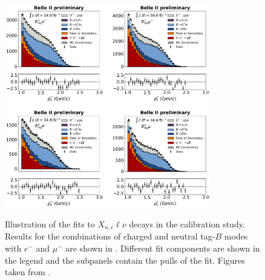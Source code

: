 \begin{figure}[htbp!]
{{            \includegraphics[width=0.8\textwidth]{figures/data_sim_corrections/tag_calibration.png}
        }
    }
    \caption{\label{fig:fei_calib} Illustration of the fits to \B\to$X_{u,c}\ell\nu$ decays in the \FEI calibration study.
    Results for the combinations of charged and neutral tag-$B$ modes with $e^-$ and $\mu^-$
    are shown in .
    Different fit components are shown in the legend and the subpanels contain the pulls of the fit.
    Figures taken from \cite{Belle-II:2020fst}.
    }
\end{figure}

